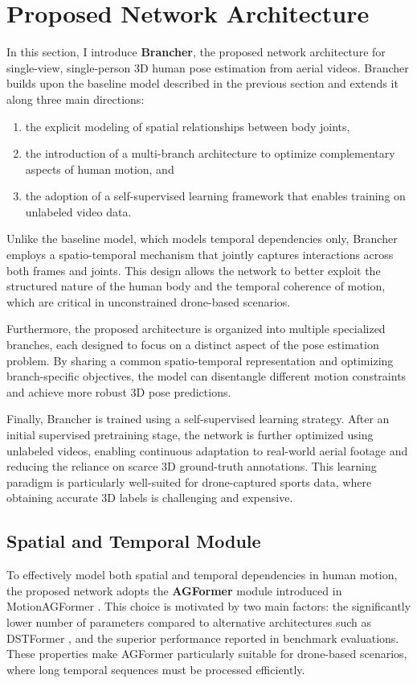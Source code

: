 \section{Proposed Network Architecture}
\label{sec:brancher}
In this section, I introduce \textbf{Brancher}, the proposed network architecture for single-view, single-person 3D human pose estimation from aerial videos.
Brancher builds upon the baseline model described in the previous section and extends it along three main directions:
\begin{enumerate}
    \item the explicit modeling of spatial relationships between body joints,
    \item the introduction of a multi-branch architecture to optimize complementary aspects of human motion, and
    \item the adoption of a self-supervised learning framework that enables training on unlabeled video data.
\end{enumerate}

Unlike the baseline model, which models temporal dependencies only, Brancher employs a spatio-temporal mechanism that jointly captures interactions across both
frames and joints.
This design allows the network to better exploit the structured nature of the human body and the temporal coherence of motion, which are critical in unconstrained 
drone-based scenarios.

Furthermore, the proposed architecture is organized into multiple specialized branches, each designed to focus on a distinct aspect of the pose estimation problem.
By sharing a common spatio-temporal representation and optimizing branch-specific objectives, the model can disentangle different motion constraints and achieve more 
robust 3D pose predictions.

Finally, Brancher is trained using a self-supervised learning strategy.
After an initial supervised pretraining stage, the network is further optimized using unlabeled videos, enabling continuous adaptation to real-world aerial footage and 
reducing the reliance on scarce 3D ground-truth annotations.
This learning paradigm is particularly well-suited for drone-captured sports data, where obtaining accurate 3D labels is challenging and expensive.

\subsection{Spatial and Temporal Module}
\label{sec:agformer}
To effectively model both spatial and temporal dependencies in human motion, the proposed network adopts the \textbf{AGFormer} module introduced in MotionAGFormer \cite{mehraban2024motionagformer}.
This choice is motivated by two main factors: the significantly lower number of parameters compared to alternative architectures such as DSTFormer \cite{zhu2023motionbert}, 
and the superior performance reported in benchmark evaluations.
These properties make AGFormer particularly suitable for drone-based scenarios, where long temporal sequences must be processed efficiently.


